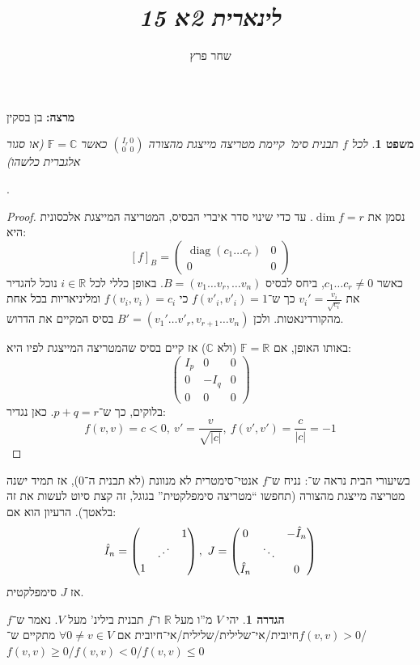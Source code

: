\documentclass[]{article}
\author{שחר פרץ}
\title{\textit{לינארית 2א 15}}
\newcommand\R     {\mathbb{R}}
\newcommand\C     {\mathbb{C}}
\DeclareMathOperator{\diag}    {diag}
\newcommand\F         {\mathbb{F}}
\newcommand\pms[1]    {\begin{pmatrix}
        #1
\end{pmatrix}}
\newtheorem{Theorem}{משפט}
\theoremstyle{definition}
\newtheorem{definition}{הגדרה}
\newcommand\theo  [1] {\begin{Theorem}#1\end{Theorem}}
\newcommand\defi  [1] {\begin{definition}#1\end{definition}}
\begin{document}
    \maketitle
    \textbf{מרצה: }בן בסקין
    
    \theo{לכל $f$ תבנית סימ' קיימת מטריצה מייצגת מהצורה $\binom{I_r \, 0}{0 \,\,\, 0}$ כאשר $\F = \C$ (או סגור אלגברית כלשהו)}. 
    \begin{proof}
            
        נסמן את $\dim f = r$. עד כדי שינוי סדר איברי הבסיס, המטריצה המייצגת אלכסונית היא:
        \[ [f]_B = \pms{\diag(c_1 \dots c_r) & 0 \\ 0 & 0} \]
        כאשר $c_1 \dots c_r \neq 0$, ביחס לבסיס $B = (v_1 \dots v_r, \dots v_n)$. באופן כללי לכל $i \in \R$ נוכל להגדיר את $v_i' = \frac{v_i}{\sqrt{c_i}}$ כך ש־$f(v'_i, v'_i) = 1$ כי $f(v_i, v_i) = c_i$ ומליניאריות בכל אחת מהקורדינאטות. ולכן $B' = (v_1' \dots v'_r, v_{r + 1} \dots v_n)$ בסיס המקיים את הדרוש. 
        
        באותו האופן, אם $\F = \R$ (ולא $\C$) אז קיים בסיס שהמטריצה המייצגת לפיו היא: 
        \[ \pms{I_p & 0 & 0 \\ 0& -I_q & 0 \\0 & 0 & 0} \]
        בלוקים, כך ש־$p + q = r$. כאן נגדיר: 
        \[ f(v, v) = c < 0, \ v' = \frac{v}{\sqrt{|c|}}, \ f(v', v') = \frac{c}{|c|} = -1 \]
    \end{proof}
    
    בשיעורי הבית נראה ש־: נניח ש־$f$ אנטי־סימטרית לא מנוונת (לא תבנית ה־$0$), אז תמיד ישנה מטריצה מייצגת מהצורה (תחפשו ``מטריצה סימפלקטית'' בגוגל, זה קצת סיוט לעשות את זה בלאטך). הרעיון הוא אם: 
    \[ \hat I_n = \pms{ && 1 \\ & \reflectbox{$\ddots$} & \\ 1}, \ J = \pms{0 & & -\hat I_n \\ & \ddots & \\ \hat I_n && 0} \]
    אז $J$ סימפלקטית. 
    
    \defi{יהי $V$ מ''ו מעל $\R$ ו־$f$ תבנית בילינ' מעל $V$. נאמר ש־$f$ חיובית/אי־שלילית/שלילית/אי־חיובית אם $\forall 0 \neq v \in V $ מתקיים ש־$f(v, v) > 0$/$f(v, v) \ge 0$/$f(v, v) < 0$/$f(v, v)\le 0$}
    
\end{document}
